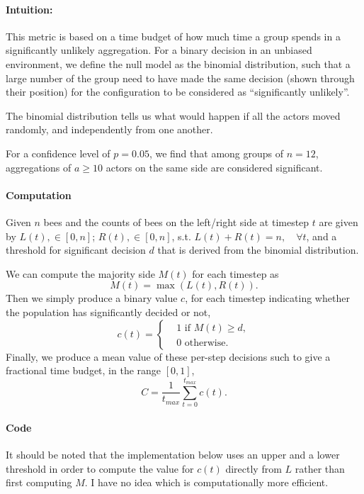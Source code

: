 \documentclass{article}
\newcommand{\scare}[1]{``#1''}
\begin{document}
\paragraph*{Intuition:} This metric is based on a time budget of how much time a group spends in a significantly unlikely aggregation.  For a binary decision in an unbiased environment, we define the null model as the binomial distribution, such that a large number of the group need to have made the same decision (shown through their position) for the configuration to be considered as \scare{significantly unlikely}.

The binomial distribution tells us what would happen if all the actors moved randomly, and independently from one another.

For a confidence level of $p=0.05$, we find that among groups of $n=12$, aggregations of $a\geq 10$ actors on the same side are considered significant.


\paragraph{Computation}

Given $n$ bees and the counts of bees on the left/right side at timestep $t$ are given by $L(t), \in [0,n]$; $R(t), \in [0,n]$, s.t. $L(t) + R(t) = n, \quad \forall t$, and a threshold for significant decision $d$ that is derived from the binomial distribution.

We can compute the majority side $M(t)$ for each timestep as
\begin{equation}
	M(t) = \max{(L(t), R(t))}.
\end{equation}
Then we simply produce a binary value $c$, for each timestep indicating whether the population has significantly decided or not,
\begin{equation}
c(t) = 
\begin{cases}
 & 1 \text{  if } M(t) \geq d, \\ 
 & 0  \text{  otherwise.}
\end{cases}
\end{equation}
Finally, we produce a mean value of these per-step decisions such to give a fractional time budget, in the range $[0, 1]$,
\begin{equation}
    C = \frac{1}{t_{max}}\sum_{t=0}^{t_{max}} c(t).
\end{equation}


\paragraph{Code}
It should be noted that the implementation below uses an upper and a lower threshold in order to compute the value for $c(t)$ directly from $L$ rather than first computing $M$.  I have no idea which is computationally more efficient.

\inputminted{python}{cdi_eg.py}
\end{document}
